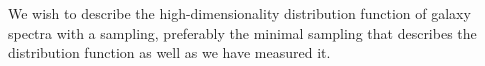 \documentclass[12pt]{article}
\begin{document}
We wish to describe the high-dimensionality distribution function of
galaxy spectra with a sampling, preferably the minimal sampling that
describes the distribution function as well as we have measured it.
\end{document}
